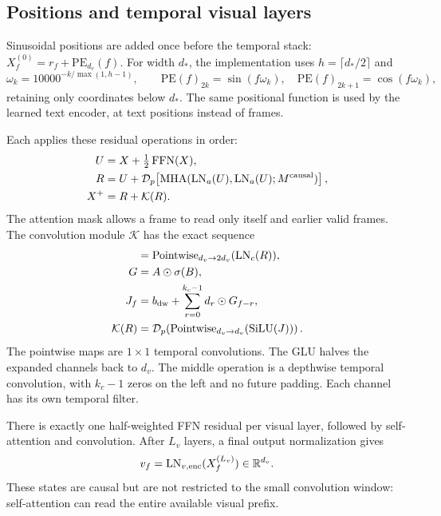 \documentclass[11pt,a4paper]{article}
\newcommand{\R}{\mathbb{R}}
\newcommand{\LN}{\operatorname{LN}}
\newcommand{\MHA}{\operatorname{MHA}}
\newcommand{\FFN}{\operatorname{FFN}}
\newcommand{\silu}{\operatorname{SiLU}}
\newcommand{\code}[1]{\texttt{\detokenize{#1}}}
\numberwithin{equation}{section}
\begin{document}
\subsection{Positions and temporal visual layers}

Sinusoidal positions are added once before the temporal stack:
$X_f^{(0)}=r_f+\mathrm{PE}_{d_v}(f)$. For width $d_*$, the implementation
uses $h=\lceil d_*/2\rceil$ and
\begin{equation}
\omega_k=10000^{-k/\max(1,h-1)},\qquad
\mathrm{PE}(f)_{2k}=\sin(f\omega_k),\quad
\mathrm{PE}(f)_{2k+1}=\cos(f\omega_k),
\end{equation}
retaining only coordinates below $d_*$. The same positional function is
used by the learned text encoder, at text positions instead of frames.

Each \code{CausalConformerLayer} applies these residual operations in order:
\begin{align}
U&=X+\tfrac12\FFN(X),\\
R&=U+\mathcal D_p\!\left[\MHA(\LN_a(U),\LN_a(U);M^{\rm causal})\right],\\
X^+&=R+\mathcal K(R).
\label{eq:visual-layer}
\end{align}
The attention mask allows a frame to read only itself and earlier
valid frames. The convolution module $\mathcal K$ has the exact sequence
\begin{align}
[A,B]&=\operatorname{Pointwise}_{d_v\to2d_v}(\LN_c(R)),\\
G&=A\odot\sigma(B),\\
J_f&=b_{\rm dw}+\sum_{r=0}^{k_c-1}d_r\odot G_{f-r},\\
\mathcal K(R)&=\mathcal D_p\!\left(
 \operatorname{Pointwise}_{d_v\to d_v}(\silu(J))\right).
\end{align}
The pointwise maps are $1\times1$ temporal convolutions. The GLU halves
the expanded channels back to $d_v$. The middle operation is a depthwise
temporal convolution, with $k_c-1$ zeros on the left and no future padding.
Each channel has its own temporal filter.

There is exactly one half-weighted FFN residual per visual layer,
followed by self-attention and convolution. After $L_v$ layers, a final
output normalization gives
\begin{equation}
v_f=\LN_{v,\rm enc}(X_f^{(L_v)})\in\R^{d_v}.
\end{equation}
These states are causal but are not restricted to the small convolution
window: self-attention can read the entire available visual prefix.
\end{document}
